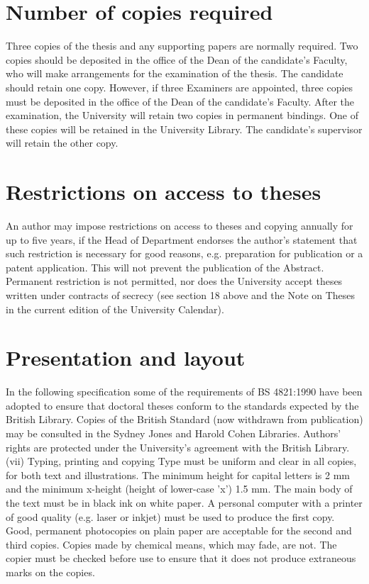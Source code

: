 \section{Number of copies required}
Three copies of the thesis and any supporting papers are normally required. 
Two copies should be deposited in the office of the Dean of the candidate's 
Faculty, who will make arrangements for the examination of the thesis. 
The candidate should retain one copy. However, if three Examiners are 
appointed, three copies must be deposited in the office of the Dean of the 
candidate's Faculty.
After the examination, the University will retain two copies in permanent 
bindings. One of these copies will be retained in the University Library. 
The candidate's supervisor will retain the other copy.

\section{Restrictions on access to theses}
An author may impose restrictions on access to theses and copying 
annually for up to five years, if the Head of Department endorses the 
author's statement that such restriction is necessary for good reasons, e.g. 
preparation for publication or a patent application. This will not prevent the 
publication of the Abstract. Permanent restriction is not permitted, nor does 
the University accept theses written under contracts of secrecy (see section 
18 above and the Note on Theses in the current edition of the University 
Calendar). 

\section{Presentation and layout}
In the following specification some of the requirements of BS 4821:1990 
have been adopted to ensure that doctoral theses conform to the standards 
expected by the British Library. Copies of the British Standard (now 
withdrawn from publication) may be consulted in the Sydney Jones and 
Harold Cohen Libraries. Authors' rights are protected under the 
University's agreement with the British Library.
(vii) Typing, printing and copying
Type must be uniform and clear in all copies, for both text and illustrations. 
The minimum height for capital letters is 2 mm and the minimum x-height 
(height of lower-case 'x') 1.5 mm. The main body of the text must be in 
black ink on white paper.
A personal computer with a printer of good quality (e.g. laser or inkjet) 
must be used to produce the first copy. Good, permanent photocopies on 
plain paper are acceptable for the second and third copies. Copies made by 
chemical means, which may fade, are not. The copier must be checked 
before use to ensure that it does not produce extraneous marks on the 
copies.

